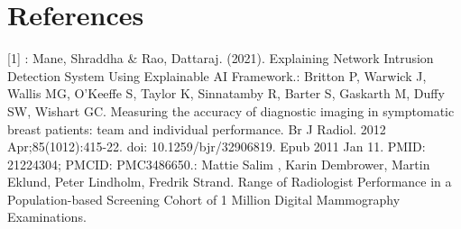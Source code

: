 \documentclass{article}
\begin{document}
\section{References}
[1] : Mane, Shraddha \& Rao, Dattaraj. (2021). Explaining Network Intrusion
Detection System Using Explainable AI Framework.\newline
[2] : Britton P, Warwick J, Wallis MG, O'Keeffe S, Taylor K, Sinnatamby R, Barter S, Gaskarth M, Duffy SW, Wishart GC. Measuring the accuracy of diagnostic imaging in symptomatic breast patients: team and individual performance. Br J Radiol. 2012 Apr;85(1012):415-22. doi: 10.1259/bjr/32906819. Epub 2011 Jan 11. PMID: 21224304; PMCID: PMC3486650.\newline
[3] : Mattie Salim , Karin Dembrower, Martin Eklund, Peter Lindholm, Fredrik Strand. Range of Radiologist Performance in a Population-based Screening Cohort of 1 Million Digital Mammography Examinations.
\end{document}
